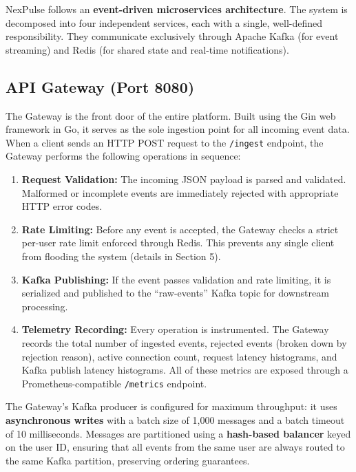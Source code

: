 \documentclass[12pt,a4paper]{article}
\begin{document}
NexPulse follows an \textbf{event-driven microservices architecture}. The system is decomposed into four independent services, each with a single, well-defined responsibility. They communicate exclusively through Apache Kafka (for event streaming) and Redis (for shared state and real-time notifications).

\subsection{API Gateway (Port 8080)}

The Gateway is the front door of the entire platform. Built using the Gin web framework in Go, it serves as the sole ingestion point for all incoming event data. When a client sends an HTTP POST request to the \texttt{/ingest} endpoint, the Gateway performs the following operations in sequence:

\begin{enumerate}[leftmargin=2em]
    \item \textbf{Request Validation:} The incoming JSON payload is parsed and validated. Malformed or incomplete events are immediately rejected with appropriate HTTP error codes.
    \item \textbf{Rate Limiting:} Before any event is accepted, the Gateway checks a strict per-user rate limit enforced through Redis. This prevents any single client from flooding the system (details in Section 5).
    \item \textbf{Kafka Publishing:} If the event passes validation and rate limiting, it is serialized and published to the ``raw-events'' Kafka topic for downstream processing.
    \item \textbf{Telemetry Recording:} Every operation is instrumented. The Gateway records the total number of ingested events, rejected events (broken down by rejection reason), active connection count, request latency histograms, and Kafka publish latency histograms. All of these metrics are exposed through a Prometheus-compatible \texttt{/metrics} endpoint.
\end{enumerate}

The Gateway's Kafka producer is configured for maximum throughput: it uses \textbf{asynchronous writes} with a batch size of 1,000 messages and a batch timeout of 10 milliseconds. Messages are partitioned using a \textbf{hash-based balancer} keyed on the user ID, ensuring that all events from the same user are always routed to the same Kafka partition, preserving ordering guarantees.
\end{document}
